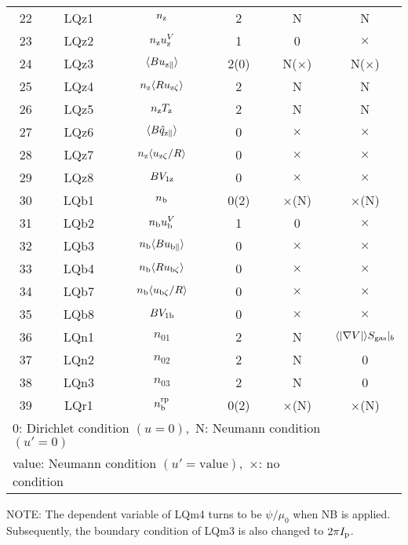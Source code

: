\documentclass[11pt]{article}
\def\r#1{{\rm#1}}
\def\aves#1{\langle#1\rangle}
\def\para{\parallel}
\def\nz{n_\r{z}}
\def\nb{n_\r{b}}
\def\Tz{T_\r{z}}
\def\uzt#1{u_{\r{#1}\zeta}}
\def\upara#1{u_{\r{#1}\para}}
\def\qhatpara#1{\hat{q}_{\r{#1}\para}}
\def\uV#1{u_\r{#1}^V}
\def\nbrp{n_\r{b}^\r{rp}}
\def\nna{n_{01}}
\def\nnb{n_{02}}
\def\nnc{n_{03}}
\begin{document}
\begin{tabular}{|c|c|c|c|c|c|}
 22   & LQz1 & $\nz$                  & 2    &  N           & N\\
 23   & LQz2 & $\nz\uV{z}$            & 1    &  0           & $\times$\\
 24   & LQz3 & $\aves{B\upara{z}}$    & 2(0) &  N($\times$) & N($\times$)\\
 25   & LQz4 & $\nz\aves{R\uzt{z}}$   & 2    &  N           & N\\
 26   & LQz5 & $\nz \Tz$              & 2    &  N           & N\\
 27   & LQz6 & $\aves{B\qhatpara{z}}$ & 0    &  $\times$    & $\times$\\
 28   & LQz7 & $\nz\aves{\uzt{z}/R}$  & 0    &  $\times$    & $\times$\\
 29   & LQz8 & $B V_{1\r{z}}$         & 0    &  $\times$    & $\times$\\
 30   & LQb1 & $\nb$                  & 0(2) &  $\times$(N) & $\times$(N)\\
 31   & LQb2 & $\nb\uV{b}$            & 1    &  0           & $\times$\\
 32   & LQb3 & $\nb\aves{B\upara{b}}$ & 0    &  $\times$    & $\times$\\
 33   & LQb4 & $\nb\aves{R\uzt{b}}$   & 0    &  $\times$    & $\times$\\
 34   & LQb7 & $\nb\aves{\uzt{b}/R}$  & 0    &  $\times$    & $\times$\\
 35   & LQb8 & $B V_{1\r{b}}$         & 0    &  $\times$    & $\times$\\
 36   & LQn1 & $\nna$                 & 2    &  N           & $\aves{|\nabla V|}S_\r{gas}|_b$\\
 37   & LQn2 & $\nnb$                 & 2    &  N           & 0\\
 38   & LQn3 & $\nnc$                 & 2    &  N           & 0\\
 39   & LQr1 & $\nbrp$                & 0(2) &  $\times$(N) & $\times$(N)\\\hline
 \multicolumn{5}{l}{0: Dirichlet condition $(u=0)$,\ 
                    N: Neumann condition $(u'=0)$}\\
 \multicolumn{5}{l}{value: Neumann condition $(u'=\mbox{value})$,\ 
                    $\times$: no condition}
\end{tabular}
%

\medskip

NOTE: The dependent variable of LQm4 turns to be $\psi/\mu_0$ when NB is
applied. Subsequently, the boundary condition of LQm3 is also changed to
$2\pi I_\r{p}$.
\end{document}
